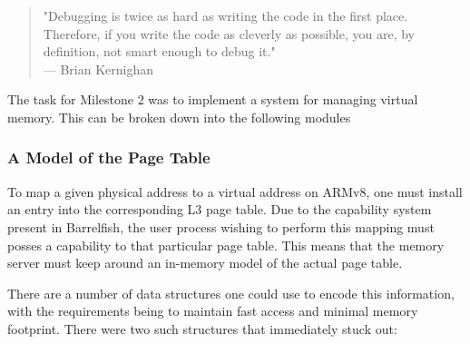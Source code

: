 

\begin{quote}
"Debugging is twice as hard as writing the code in the first place. Therefore, if you write the code as cleverly as possible, you are, by definition, not smart enough to debug it." \\
\hspace*{\fill} — Brian Kernighan 
\end{quote}

The task for Milestone 2 was to implement a system for managing virtual memory. This can be broken down into the following modules


\subsubsection*{A Model of the Page Table}

To map a given physical address to a virtual address on ARMv8, one must install an entry into the corresponding L3 page table. Due to the capability system present in Barrelfish, the user process wishing to perform this mapping must posses a capability to that particular page table. This means that the memory server must keep around an in-memory model of the actual page table. 

There are a number of data structures one could use to encode this information, with the requirements being to maintain fast access and minimal memory footprint. There were two such structures that immediately stuck out:



